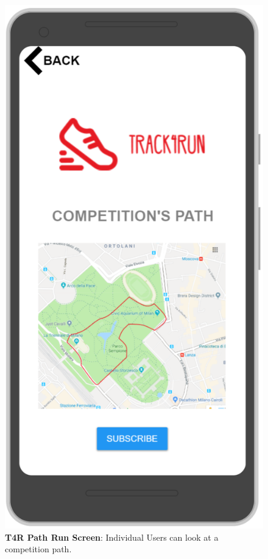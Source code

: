 \begin{figure}[H]
\centering
\includegraphics[scale = 0.5]{Mocks/Mobile_T4R_Path.PNG}
\caption{\textbf{T4R Path Run Screen}: Individual Users can look at a competition path.}
\end{figure}


